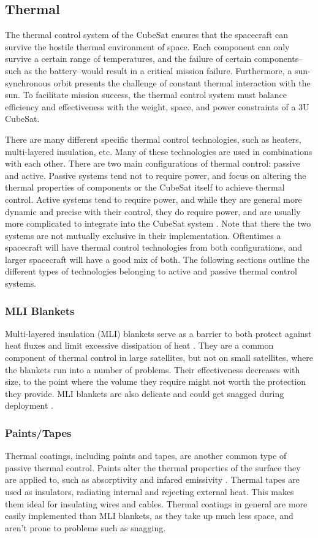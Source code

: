 \subsection{Thermal}
The thermal control system of the CubeSat ensures that the spacecraft can survive the hostile thermal environment of space. Each component can only survive a certain range of temperatures, and the failure of certain components--such as the battery--would result in a critical mission failure. Furthermore, a sun-synchronous orbit presents the challenge of constant thermal interaction with the sun. To facilitate mission success, the thermal control system must balance efficiency and effectiveness with the weight, space, and power constraints of a 3U CubeSat. 

There are many different specific thermal control technologies, such as heaters, multi-layered insulation, etc. Many of these technologies are used in combinations with each other. There are two main configurations of thermal control: passive and active. Passive systems tend not to require power, and focus on altering the thermal properties of components or the CubeSat itself to achieve thermal control. Active systems tend to require power, and while they are general more dynamic and precise with their control, they do require power, and are usually more complicated to integrate into the CubeSat system \cite{thermo}. Note that there the two systems are not mutually exclusive in their implementation. Oftentimes a spacecraft will have thermal control technologies from both configurations, and larger spacecraft will have a good mix of both. The following sections outline the different types of technologies belonging to active and passive thermal control systems. 
\subsubsection{MLI Blankets}
Multi-layered insulation (MLI) blankets serve as a barrier to both protect against heat fluxes and limit excessive dissipation of heat \cite{thermo}. They are a common component of thermal control in large satellites, but not on small satellites, where the blankets run into a number of problems. Their effectiveness decreases with size, to the point where the volume they require might not worth the protection they provide. MLI blankets are also delicate and could get snagged during deployment \cite{thermo}. 

\subsubsection{Paints/Tapes}
Thermal coatings, including paints and tapes, are another common type of passive thermal control. Paints alter the thermal properties of the surface they are applied to, such as absorptivity and infared emissivity \cite{thermo}. Thermal tapes are used as insulators, radiating internal and rejecting external heat. This makes them ideal for insulating wires and cables. Thermal coatings in general are more easily implemented than MLI blankets, as they take up much less space, and aren't prone to problems such as snagging. 

